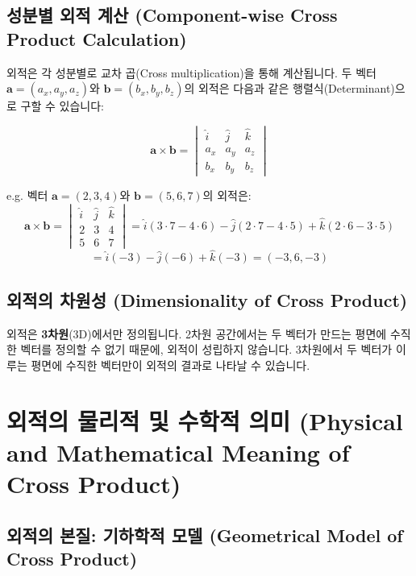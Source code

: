 \documentclass[12pt]{article}
\begin{document}
\subsection{성분별 외적 계산 (Component-wise Cross Product Calculation)}

\noindent 외적은 각 성분별로 교차 곱(Cross multiplication)을 통해 계산됩니다. 두 벡터 \(\mathbf{a} = (a_x, a_y, a_z)\)와 \(\mathbf{b} = (b_x, b_y, b_z)\)의 외적은 다음과 같은 행렬식(Determinant)으로 구할 수 있습니다:

\[
  \mathbf{a} \times \mathbf{b} = \begin{vmatrix}
    \hat{i} & \hat{j} & \hat{k} \\
    a_x     & a_y     & a_z     \\
    b_x     & b_y     & b_z
  \end{vmatrix}
\]

\vspace{1\baselineskip}
\noindent {} e.g. 벡터 \(\mathbf{a} = (2, 3, 4)\)와 \(\mathbf{b} = (5, 6, 7)\)의 외적은:
\[
  \mathbf{a} \times \mathbf{b} = \begin{vmatrix}
    \hat{i} & \hat{j} & \hat{k} \\
    2       & 3       & 4       \\
    5       & 6       & 7
  \end{vmatrix} = \hat{i}(3 \cdot 7 - 4 \cdot 6) - \hat{j}(2 \cdot 7 - 4 \cdot 5) + \hat{k}(2 \cdot 6 - 3 \cdot 5)
\]
\[
  = \hat{i}(-3) - \hat{j}(-6) + \hat{k}(-3) = (-3, 6, -3)
\]

\subsection{외적의 차원성 (Dimensionality of Cross Product)}

\noindent 외적은 \textbf{3차원}(3D)에서만 정의됩니다. 2차원 공간에서는 두 벡터가 만드는 평면에 수직한 벡터를 정의할 수 없기 때문에, 외적이 성립하지 않습니다. 3차원에서 두 벡터가 이루는 평면에 수직한 벡터만이 외적의 결과로 나타날 수 있습니다.

\section{외적의 물리적 및 수학적 의미 (Physical and Mathematical Meaning of Cross Product)}

\subsection{외적의 본질: 기하학적 모델 (Geometrical Model of Cross Product)}
\end{document}
